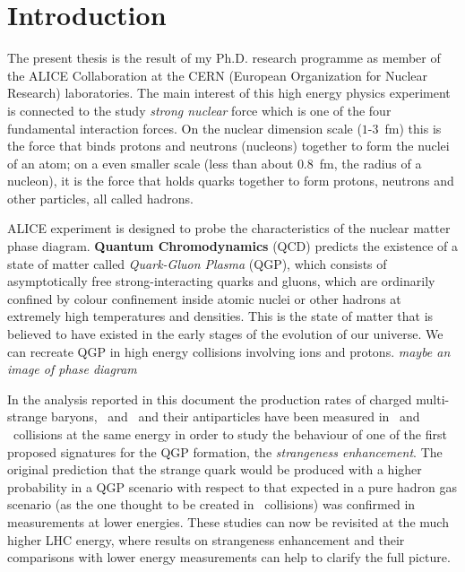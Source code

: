 \clearpage
{}
\chapter*{Introduction}
The present thesis is the result of my Ph.D. research programme as member of the ALICE Collaboration at the CERN (European Organization for Nuclear Research) laboratories. The main interest of this high energy physics experiment is connected to the study \textit{strong nuclear} force which is one of the four fundamental interaction forces. On the nuclear dimension scale (\mbox{$1$-$3$ fm}) this is the force that binds protons and neutrons (nucleons) together to form the nuclei of an atom; on a even smaller scale (less than about \mbox{$0.8$ fm}, the radius of a nucleon), it is the force that holds quarks together to form protons, neutrons and other particles, all called hadrons. 


ALICE experiment is designed to probe the characteristics of the nuclear matter phase diagram. \textbf{Quantum Chromodynamics} (QCD) predicts the existence of a state of matter called \emph{Quark-Gluon Plasma} (QGP),  which consists of asymptotically free strong-interacting quarks and gluons, which are ordinarily confined by colour confinement inside atomic nuclei or other hadrons at extremely high temperatures and densities. This is the state of matter that is believed to have existed in the early stages of the evolution of our universe. We can recreate QGP in high energy collisions involving ions and protons. \textit{maybe an image of phase diagram}


In the analysis reported in this document the production rates of charged multi-strange baryons, \csi\ and \om\ and their antiparticles have been measured in \PbPb\ and \pp\ collisions at the same energy in order to study the behaviour of one of the first proposed signatures for the QGP formation, the \emph{strangeness enhancement}. The original prediction that the strange quark would be produced with a higher probability in a QGP scenario with respect to that expected in a pure hadron gas scenario (as the one thought to be created in \pp\ collisions) was confirmed in measurements at lower energies. These studies can now be revisited at the much higher LHC energy, where results on strangeness enhancement and their comparisons with lower energy measurements can help to clarify the full picture. 

